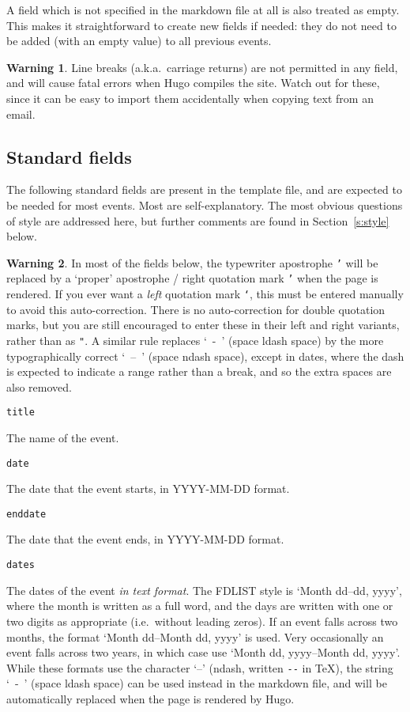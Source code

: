 \documentclass[12pt]{scrartcl}
\theoremstyle{definition}
\newtheorem*{warn}{Warning}
\begin{document}
A field which is not specified in the markdown file at all is also treated as empty. This makes it straightforward to create new fields if needed: they do not need to be added (with an empty value) to all previous events.

\begin{warn}
Line breaks (a.k.a.\ carriage returns) are not permitted in any field, and will cause fatal errors when Hugo compiles the site.
Watch out for these, since it can be easy to import them accidentally when copying text from an email.
\end{warn}

\subsection{Standard fields}
\label{s:standard_fields}
The following standard fields are present in the template file, and are expected to be needed for most events.
Most are self-explanatory.
The most obvious questions of style are addressed here, but further comments are found in Section~\ref{s:style} below.

\begin{warn}
In most of the fields below, the typewriter apostrophe \texttt{'} will be replaced by a `proper' apostrophe / right quotation mark \texttt{’} when the page is rendered. If you ever want a \emph{left} quotation mark \texttt{‘}, this must be entered manually to avoid this auto-correction.
There is no auto-correction for double quotation marks, but you are still encouraged to enter these in their left and right variants, rather than as \texttt{"}.
A similar rule replaces `~-~' (space ldash space) by the more typographically correct `~--~' (space ndash space), except in dates, where the dash is expected to indicate a range rather than a break, and so the extra spaces are also removed.
\end{warn}

\noindent\verb|title|\nopagebreak

The name of the event.
\medskip

\noindent\verb|date|\nopagebreak

The date that the event starts, in YYYY-MM-DD format.
\medskip

\noindent\verb|enddate|\nopagebreak

The date that the event ends, in YYYY-MM-DD format.
\medskip

\noindent\verb|dates|\nopagebreak

The dates of the event \emph{in text format}.
The FDLIST style is `Month dd--dd, yyyy', where the month is written as a full word, and the days are written with one or two digits as appropriate (i.e.\ without leading zeros).
If an event falls across two months, the format `Month dd--Month dd, yyyy' is used.
Very occasionally an event falls across two years, in which case use `Month dd, yyyy--Month dd, yyyy'.
While these formats use the character `--' (ndash, written \verb|--| in \TeX), the string `~-~' (space ldash space) can be used instead in the markdown file, and will be automatically replaced when the page is rendered by Hugo.
\end{document}
